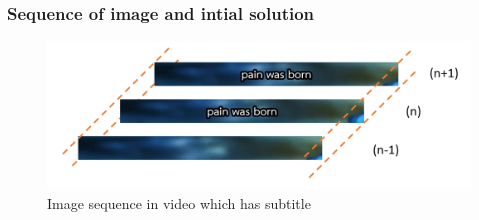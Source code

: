 \documentclass[xcolor=dvipsnames, xetex,serif]{beamer}
\begin{document}
    \begin{frame}
        \frametitle{Sequence of image and intial solution}
        \begin{figure}[H]
            \centering
            \includegraphics[width=0.8\linewidth]{images/skipborrow/frame_sequence.png}
            \caption{Image sequence in video which has subtitle}
        \end{figure}
    \end{frame}
\end{document}
